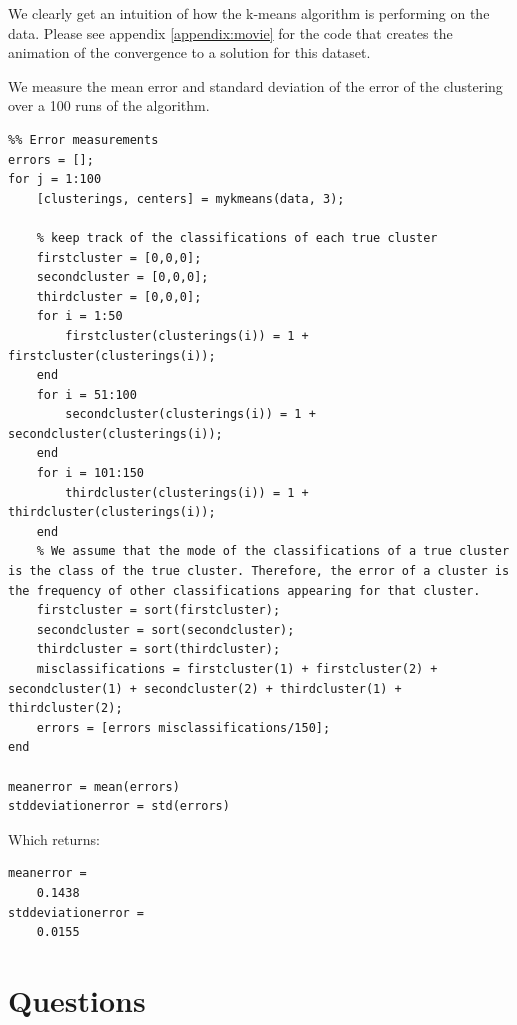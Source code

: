 \documentclass[11pt]{article}
\begin{document}
    We clearly get an intuition of how the k-means algorithm is performing on the data. Please see appendix \ref{appendix:movie} for the code that creates the animation of the convergence to a solution for this dataset.
    \par We measure the mean error and standard deviation of the error of the clustering over a 100 runs of the algorithm.
    \begin{lstlisting}
%% Error measurements
errors = [];
for j = 1:100
    [clusterings, centers] = mykmeans(data, 3);
    
    % keep track of the classifications of each true cluster
    firstcluster = [0,0,0];
    secondcluster = [0,0,0];
    thirdcluster = [0,0,0];
    for i = 1:50
        firstcluster(clusterings(i)) = 1 + firstcluster(clusterings(i));
    end
    for i = 51:100
        secondcluster(clusterings(i)) = 1 + secondcluster(clusterings(i));
    end
    for i = 101:150
        thirdcluster(clusterings(i)) = 1 + thirdcluster(clusterings(i));
    end
    % We assume that the mode of the classifications of a true cluster is the class of the true cluster. Therefore, the error of a cluster is the frequency of other classifications appearing for that cluster.
    firstcluster = sort(firstcluster);
    secondcluster = sort(secondcluster);
    thirdcluster = sort(thirdcluster);
    misclassifications = firstcluster(1) + firstcluster(2) + secondcluster(1) + secondcluster(2) + thirdcluster(1) + thirdcluster(2);
    errors = [errors misclassifications/150];
end

meanerror = mean(errors)
stddeviationerror = std(errors)\end{lstlisting}
    
    Which returns:
    \begin{lstlisting}
meanerror =
    0.1438
stddeviationerror =
    0.0155\end{lstlisting}

\section{Questions}
\end{document}
